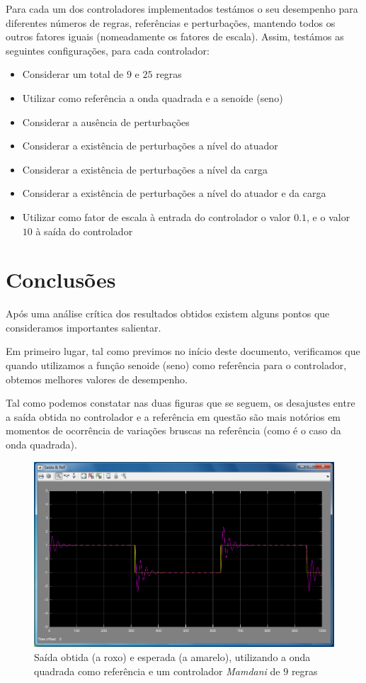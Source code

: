 \documentclass{article}
\begin{document}
Para cada um dos controladores implementados testámos o seu desempenho para diferentes números de regras, referências e perturbações, mantendo todos os outros fatores iguais (nomeadamente os fatores de escala). Assim, testámos as seguintes configurações, para cada controlador:

\begin{itemize}
\item Considerar um total de $9$ e $25$ regras
\item Utilizar como referência a onda quadrada e a senoide (seno)
\item Considerar a ausência de perturbações
\item Considerar a existência de perturbações a nível do atuador
\item Considerar a existência de perturbações a nível da carga
\item Considerar a existência de perturbações a nível do atuador e da carga
\item Utilizar como fator de escala à entrada do controlador o valor $0.1$, e o valor $10$ à saída do controlador
\end{itemize}

\pagebreak

\section{Conclusões}

Após uma análise crítica dos resultados obtidos existem alguns pontos que consideramos importantes salientar.

Em primeiro lugar, tal como previmos no início deste documento, verificamos que quando utilizamos a função senoide (seno) como referência para o controlador, obtemos melhores valores de desempenho.

Tal como podemos constatar nas duas figuras que se seguem, os desajustes entre a saída obtida no controlador e a referência em questão são mais notórios em momentos de ocorrência de variações bruscas na referência (como é o caso da onda quadrada).

\begin{figure}[h]
  \centering
      \includegraphics[scale=0.3]{Images/Mamdani_9_square.png}
  \caption{Saída obtida (a roxo) e esperada (a amarelo), utilizando a onda quadrada como referência e um controlador \emph{Mamdani} de $9$ regras}
\end{figure}
\end{document}

